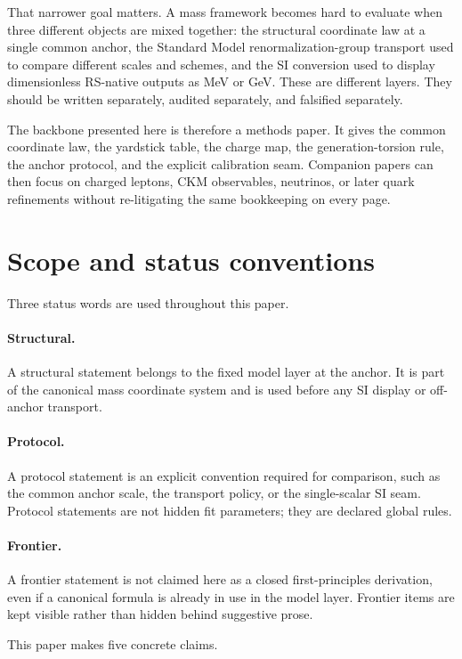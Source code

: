 \documentclass[11pt]{article}
\begin{document}
That narrower goal matters. A mass framework becomes hard to evaluate when three different objects are mixed together: the structural coordinate law at a single common anchor, the Standard Model renormalization-group transport used to compare different scales and schemes, and the SI conversion used to display dimensionless RS-native outputs as MeV or GeV. These are different layers. They should be written separately, audited separately, and falsified separately.

The backbone presented here is therefore a methods paper. It gives the common coordinate law, the yardstick table, the charge map, the generation-torsion rule, the anchor protocol, and the explicit calibration seam. Companion papers can then focus on charged leptons, CKM observables, neutrinos, or later quark refinements without re-litigating the same bookkeeping on every page.

\section{Scope and status conventions}

Three status words are used throughout this paper.

\paragraph{Structural.} A structural statement belongs to the fixed model layer at the anchor. It is part of the canonical mass coordinate system and is used before any SI display or off-anchor transport.

\paragraph{Protocol.} A protocol statement is an explicit convention required for comparison, such as the common anchor scale, the transport policy, or the single-scalar SI seam. Protocol statements are not hidden fit parameters; they are declared global rules.

\paragraph{Frontier.} A frontier statement is not claimed here as a closed first-principles derivation, even if a canonical formula is already in use in the model layer. Frontier items are kept visible rather than hidden behind suggestive prose.

This paper makes five concrete claims.
\end{document}
